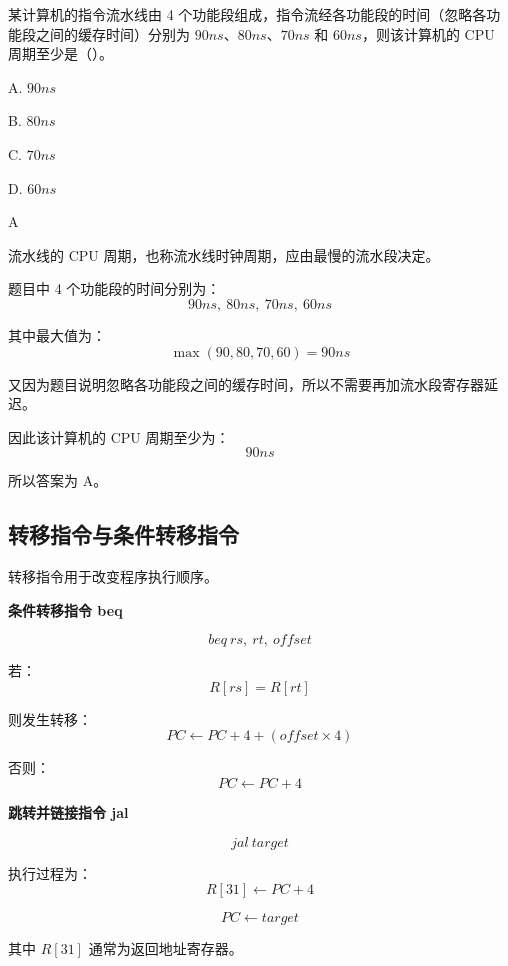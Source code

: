 \begin{question}
某计算机的指令流水线由 4 个功能段组成，指令流经各功能段的时间（忽略各功能段之间的缓存时间）分别为 $90ns$、$80ns$、$70ns$ 和 $60ns$，则该计算机的 CPU 周期至少是（）。

A. $90ns$

B. $80ns$

C. $70ns$

D. $60ns$
\end{question}

\begin{answer}
A
\end{answer}

\begin{analysisenv}
流水线的 CPU 周期，也称流水线时钟周期，应由最慢的流水段决定。

题目中 4 个功能段的时间分别为：
\[
90ns,\ 80ns,\ 70ns,\ 60ns
\]

其中最大值为：
\[
\max(90,80,70,60)=90ns
\]

又因为题目说明忽略各功能段之间的缓存时间，所以不需要再加流水段寄存器延迟。

因此该计算机的 CPU 周期至少为：
\[
90ns
\]

所以答案为 A。
\end{analysisenv}



















\subsection{转移指令与条件转移指令}

\begin{knowledge}
转移指令用于改变程序执行顺序。

\textbf{条件转移指令 beq}

\[
beq\ rs,\ rt,\ offset
\]

若：
\[
R[rs]=R[rt]
\]

则发生转移：
\[
PC \leftarrow PC+4+(offset \times 4)
\]

否则：
\[
PC \leftarrow PC+4
\]

\textbf{跳转并链接指令 jal}

\[
jal\ target
\]

执行过程为：
\[
R[31] \leftarrow PC+4
\]

\[
PC \leftarrow target
\]

其中 $R[31]$ 通常为返回地址寄存器。
\end{knowledge}


